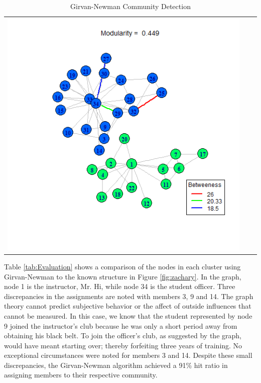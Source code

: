 \documentclass[letterpaper,11pt]{report}
\begin{document}
\begin{savenotes}
\begin{table}[htbp]
\begin{tabular}{ccc}
			\includegraphics[scale=0.28]{karateClub-community-0013.png} &
			&  \\
		\end{tabular}
	\caption{Girvan-Newman Community Detection}
	\label{tab:GirvanNewmanCommunityDetection}
\end{table}

\indent{}Table \ref{tab:Evaluation} shows a comparison of the nodes in each cluster using Girvan-Newman to the known structure in Figure \ref{fig:zachary}. In the graph, node 1 is the instructor, Mr. Hi, while node 34 is the student officer. Three discrepancies in the assignments are noted with members 3, 9 and 14. The graph theory cannot predict subjective behavior or the affect of outside influences that cannot be measured. In this case, we know that the student represented by node 9 joined the instructor's club because he was only a short period away from obtaining his black belt. To join the officer's club, as suggested by the graph, would have meant starting over; thereby forfeiting three years of training. No exceptional circumstances were noted for members 3 and 14. Despite these small discrepancies, the Girvan-Newman algorithm achieved a 91\% hit ratio in assigning members to their respective community.


\end{savenotes}
\end{document}
